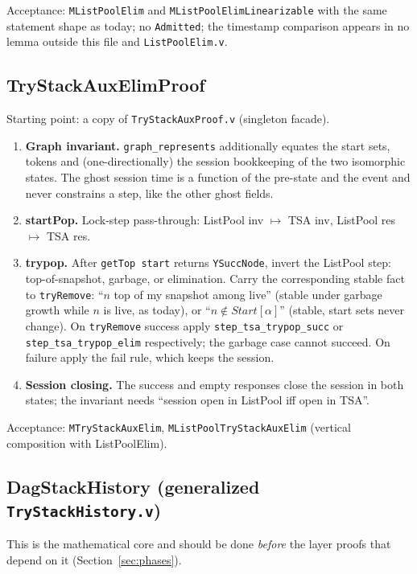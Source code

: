 \documentclass[11pt]{article}
\theoremstyle{definition}
\theoremstyle{remark}
\newcommand{\code}[1]{\texttt{#1}}
\newcommand{\file}[1]{\texttt{#1}}
\newcommand{\Start}{\mathit{Start}}
\newcommand{\sol}[1]{\textbf{#1}}
\begin{document}
Acceptance: \code{MListPoolElim} and \code{MListPoolElimLinearizable}
with the same statement shape as today; no \code{Admitted}; the
timestamp comparison appears in no lemma outside this file and
\file{ListPoolElim.v}.

\subsection{TryStackAuxElimProof}

Starting point: a copy of \file{TryStackAuxProof.v} (singleton facade).

\begin{enumerate}[nosep]
\item \sol{Graph invariant.} \code{graph\_represents} additionally equates
  the start sets, tokens and (one-directionally) the session bookkeeping
  of the two isomorphic states. The ghost session time is a function of
  the pre-state and the event and never constrains a step, like the other
  ghost fields.
\item \sol{startPop.} Lock-step pass-through: ListPool inv $\mapsto$
  TSA inv, ListPool res $\mapsto$ TSA res.
\item \sol{trypop.} After \code{getTop start} returns \code{YSuccNode},
  invert the ListPool step: top-of-snapshot, garbage, or elimination.
  Carry the corresponding stable fact to \code{tryRemove}: ``$n$ top of
  my snapshot among live'' (stable under garbage growth while $n$ is
  live, as today), or ``$n \notin \Start[\alpha]$'' (stable, start sets
  never change). On \code{tryRemove} success apply
  \code{step\_tsa\_trypop\_succ} or \code{step\_tsa\_trypop\_elim}
  respectively; the garbage case cannot succeed. On failure apply the
  fail rule, which keeps the session.
\item \sol{Session closing.} The success and empty responses close the
  session in both states; the invariant needs ``session open in ListPool
  iff open in TSA''.
\end{enumerate}

Acceptance: \code{MTryStackAuxElim}, \code{MListPoolTryStackAuxElim}
(vertical composition with ListPoolElim).

\subsection{DagStackHistory (generalized \file{TryStackHistory.v})}

This is the mathematical core and should be done \emph{before} the layer
proofs that depend on it (Section~\ref{sec:phases}).
\end{document}
